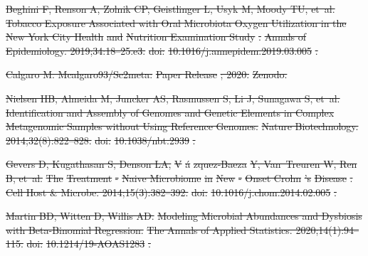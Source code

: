 \documentclass[10pt,letterpaper]{article}
\providecommand{\DIFdeltex}[1]{{\protect\color{red}\sout{#1}}}                      %
\providecommand{\DIFdel}[1]{\texorpdfstring{\DIFdeltex{#1}}{}} %
\begin{document}
\DIFdel{Beghini F, Renson A, Zolnik CP, Geistlinger L, Usyk M, Moody TU, et~al.
}%
\DIFdel{Tobacco Exposure Associated with Oral Microbiota Oxygen Utilization
  in the }%
\DIFdel{New York City Health}%
\DIFdel{and }%
\DIFdel{Nutrition Examination Study}%
\DIFdel{.
}%
\DIFdel{Annals of Epidemiology. 2019;34:18--25.e3.
}%
\DIFdel{doi:}%
\DIFdel{10.1016/j.annepidem.2019.03.005}%
\DIFdel{.
}%

\DIFdel{Calgaro M. Mcalgaro93/Sc2meta: }%
\DIFdel{Paper Release}%
\DIFdel{; 2020.
}%
\DIFdel{Zenodo.
}%

\DIFdel{Nielsen HB, Almeida M, Juncker AS, Rasmussen S, Li J, Sunagawa S, et~al.
}%
\DIFdel{Identification and Assembly of Genomes and Genetic Elements in
  Complex Metagenomic Samples without Using Reference Genomes.
}%
\DIFdel{Nature Biotechnology. 2014;32(8):822--828.
}%
\DIFdel{doi:}%
\DIFdel{10.1038/nbt.2939}%
\DIFdel{.
}%

\DIFdel{Gevers D, Kugathasan S, Denson LA, }%
\DIFdel{V}%
\DIFdel{\'a}%
\DIFdel{zquez-Baeza}%
\DIFdel{Y, Van~Treuren W, Ren B,
  et~al.
}%
\DIFdel{The }%
\DIFdel{Treatment}%
\DIFdel{-}%
\DIFdel{Naive Microbiome}%
\DIFdel{in }%
\DIFdel{New}%
\DIFdel{-}%
\DIFdel{Onset Crohn}%
\DIFdel{'s
  }%
\DIFdel{Disease}%
\DIFdel{.
}%
\DIFdel{Cell Host \& Microbe. 2014;15(3):382--392.
}%
\DIFdel{doi:}%
\DIFdel{10.1016/j.chom.2014.02.005}%
\DIFdel{.
}%

\DIFdel{Martin BD, Witten D, Willis AD.
}%
\DIFdel{Modeling Microbial Abundances and Dysbiosis with Beta-Binomial
  Regression.
}%
\DIFdel{The Annals of Applied Statistics. 2020;14(1):94--115.
}%
\DIFdel{doi:}%
\DIFdel{10.1214/19-AOAS1283}%
\DIFdel{.
}%
\end{document}
